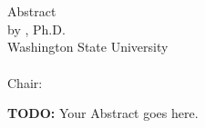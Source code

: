 \label{chap:chapter-1}

\begin{center}
	\begin{singlespace}
		\label{ssec:abstract}

		\MakeUppercase{\mytitleA}\\
    	\bigskip
    	\MakeUppercase{\mytitleB}\\
		\bigskip
		Abstract\\
		\bigskip \bigskip \bigskip
		by \myname, Ph.D.\\
		Washington State University\\
		\, \currentyear \\
		\bigskip \bigskip \bigskip
		Chair: \mychair	
	\end{singlespace}
\end{center}
  

\textbf{TODO:}  Your Abstract goes here.


\newpage
